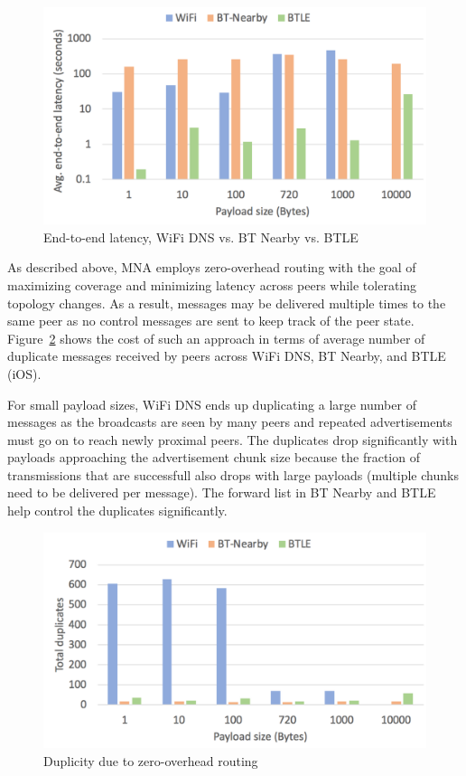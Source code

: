\documentclass[conference]{IEEEtran}
\begin{document}
\begin{figure}[htbp]
\centerline{\includegraphics[width=\columnwidth]{figs/e2e_latency}}
\caption{End-to-end latency, WiFi DNS vs. BT Nearby vs. BTLE}
\label{fig:e2e}
\end{figure}

As described above, MNA employs zero-overhead routing with the goal of
maximizing coverage and minimizing latency across peers while
tolerating topology changes.  As a result, messages may be delivered
multiple times to the same peer as no control messages are sent to
keep track of the peer state.  Figure~\ref{fig:dup} shows the cost of
such an approach in terms of average number of duplicate messages
received by peers across WiFi DNS, BT Nearby, and BTLE (iOS). 

For small payload sizes, WiFi DNS ends up duplicating a large number
of messages as the broadcasts are seen by many peers and repeated
advertisements must go on to reach newly proximal peers. The
duplicates drop significantly with payloads approaching the
advertisement chunk size because the fraction of transmissions that
are successfull also drops with large payloads (multiple chunks need
to be delivered per message). The forward list in BT Nearby and BTLE
help control the duplicates significantly.

\begin{figure}[htbp]
\centerline{\includegraphics[width=\columnwidth]{figs/duplicates}}
\caption{Duplicity due to zero-overhead routing}
\label{fig:dup}
\end{figure}
\end{document}
